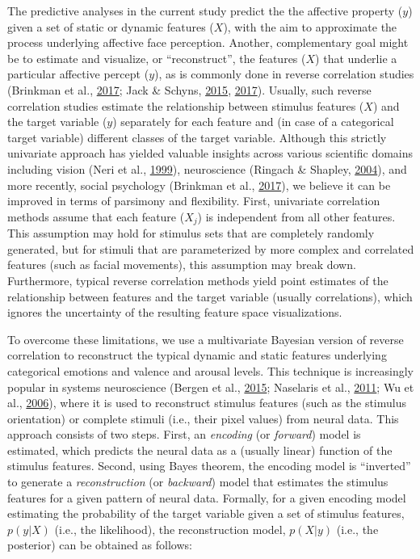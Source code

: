 \documentclass[12pt,american,a4paper,oneside,]{memoir} %
\begin{document}
The predictive analyses in the current study predict the the affective property (\(y\)) given a set of static or dynamic features (\(X\)), with the aim to approximate the process underlying affective face perception. Another, complementary goal might be to estimate and visualize, or ``reconstruct'', the features (\(X\)) that underlie a particular affective percept (\(y\)), as is commonly done in reverse correlation studies (Brinkman et al., \protect\hyperlink{ref-Brinkman2017-hg}{2017}; Jack \& Schyns, \protect\hyperlink{ref-Jack2015-sh}{2015}, \protect\hyperlink{ref-Jack2017-gt}{2017}). Usually, such reverse correlation studies estimate the relationship between stimulus features (\(X\)) and the target variable (\(y\)) separately for each feature and (in case of a categorical target variable) different classes of the target variable. Although this strictly univariate approach has yielded valuable insights across various scientific domains including vision (Neri et al., \protect\hyperlink{ref-Neri1999-rj}{1999}), neuroscience (Ringach \& Shapley, \protect\hyperlink{ref-Ringach2004-nn}{2004}), and more recently, social psychology (Brinkman et al., \protect\hyperlink{ref-Brinkman2017-hg}{2017}), we believe it can be improved in terms of parsimony and flexibility. First, univariate correlation methods assume that each feature (\(X_{j}\)) is independent from all other features. This assumption may hold for stimulus sets that are completely randomly generated, but for stimuli that are parameterized by more complex and correlated features (such as facial movements), this assumption may break down. Furthermore, typical reverse correlation methods yield point estimates of the relationship between features and the target variable (usually correlations), which ignores the uncertainty of the resulting feature space visualizations.

To overcome these limitations, we use a multivariate Bayesian version of reverse correlation to reconstruct the typical dynamic and static features underlying categorical emotions and valence and arousal levels. This technique is increasingly popular in systems neuroscience (Bergen et al., \protect\hyperlink{ref-Van_Bergen2015-kl}{2015}; Naselaris et al., \protect\hyperlink{ref-Naselaris2011-oh}{2011}; Wu et al., \protect\hyperlink{ref-Wu2006-qs}{2006}), where it is used to reconstruct stimulus features (such as the stimulus orientation) or complete stimuli (i.e., their pixel values) from neural data. This approach consists of two steps. First, an \emph{encoding} (or \emph{forward}) model is estimated, which predicts the neural data as a (usually linear) function of the stimulus features. Second, using Bayes theorem, the encoding model is ``inverted'' to generate a \emph{reconstruction} (or \emph{backward}) model that estimates the stimulus features for a given pattern of neural data. Formally, for a given encoding model estimating the probability of the target variable given a set of stimulus features, \(p(y | X)\) (i.e., the likelihood), the reconstruction model, \(p(X | y)\) (i.e., the posterior) can be obtained as follows:
\end{document}
